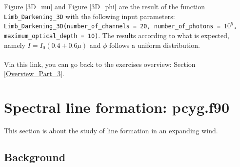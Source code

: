 \documentclass[../main/main.tex]{subfiles}
\begin{document}
Figure \ref{3D_mu} and Figure \ref{3D_phi}  are the result of 
the function \texttt{Limb\_Darkening\_3D} with the following input parameters: \texttt{Limb\_Darkening\_3D(number\_of\_channels = 20, number\_of\_photons = $10^5$, \\ maximum\_optical\_depth = 10)}. The results according to what is expected, namely $I = I_0(0.4+0.6\mu)$ and $\phi$ follows a uniform distribution.

\paragraph{}
\noindent{}

\vspace{0.4cm}
Via this link, you can go back to the exercises overview: Section \underline{\ref{Overview_Part_3}}.


\newpage
\section{Spectral line formation: pcyg.f90}
This section is about the study of line formation in an expanding wind.

\subsection*{Background}
\end{document}
